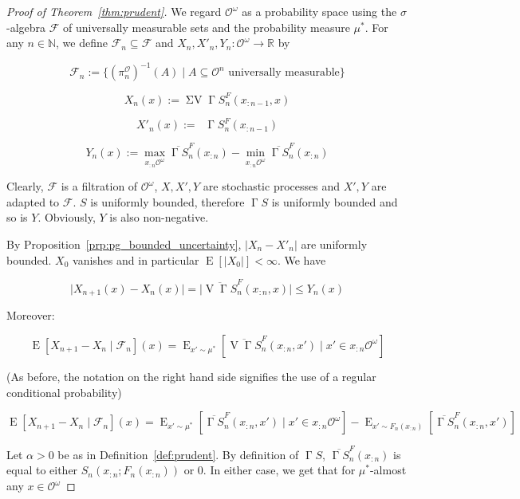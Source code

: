 \documentclass[11pt]{article}
\theoremstyle{definition}
\theoremstyle{plain}
\newcommand{\Nats}{\mathbb{N}}
\newcommand{\Reals}{\mathbb{R}}
\newcommand{\A}[1]{\lvert #1 \rvert}
\DeclareMathOperator{\E}{E}
\newcommand{\Ob}{\mathcal{O}}
\newcommand{\OO}{\Ob^\omega}
\newcommand{\PO}{\pi^\Ob}
\DeclareMathOperator{\V}{V}
\DeclareMathOperator{\SV}{\Sigma V}
\DeclareMathOperator{\SVM}{\Sigma V_{\min}}
\DeclareMathOperator{\PG}{\Gamma}
\newcommand{\F}{\mathcal{F}}
\begin{document}
\begin{proof}[Proof of Theorem~\ref{thm:prudent}]

We regard ${\OO}$ as a probability space using the ${\sigma}$-algebra $\F$ of universally measurable sets and the probability measure ${\mu^*}$. For any ${n \in \Nats}$, we define ${\F_n \subseteq \F}$ and $X_n,X'_n,Y_n: \OO \rightarrow \Reals$ by 

$$\F_n := \{\left(\PO_n\right)^{-1}\left(A\right) \mid A \subseteq \Ob^n \text{ universally measurable}\}$$

$$X_n\left(x\right):= \SV \PG{S}^F_{n}\left(x_{:n-1},x\right)$$

$$X'_n\left(x\right):= \SVM \PG{S}^F_{n}\left(x_{:n-1}\right)$$

$$Y_n\left(x\right):=\max_{x_{:n}\OO} \overline{\PG{S}}^F_{n}\left(x_{:n}\right) - \min_{x_{:n}\OO} \overline{\PG{S}}^F_{n}\left(x_{:n}\right)$$

Clearly, ${\F}$ is a filtration of ${\OO}$, ${X,X',Y}$ are stochastic processes and ${X',Y}$ are adapted to ${\F}$. ${S}$ is uniformly bounded, therefore ${\PG{S}}$  is uniformly bounded and so is ${Y}$. Obviously, ${Y}$ is also non-negative.

By Proposition~\ref{prp:pg_bounded_uncertainty}, ${\A{X_n-X'_n}}$ are uniformly bounded. ${X_0}$ vanishes and in particular ${\E\left[\A{X_0}\right] < \infty}$. We have

$$\A{X_{n+1}\left(x\right)-X_n\left(x\right)} = \A{\overline{\V{\PG{S}}}_{n}^F\left(x_{:n},x\right)} \leq Y_n\left(x\right)$$

Moreover:

$$\E\left[X_{n+1} - X_n \mid \F_n\right]\left(x\right) = \E_{x' \sim \mu^*}\left[\overline{\V{\PG{S}}}_{n}^F\left(x_{:n},x'\right) \mid x' \in x_{:n}\OO\right]$$

(As before, the notation on the right hand side signifies the use of a regular conditional probability)

$$\E\left[X_{n+1} - X_n \mid \F_n\right]\left(x\right) = \E_{x' \sim \mu^*}\left[\overline{\PG{S}}_{n}^F\left(x_{:n},x'\right) \mid x' \in x_{:n}\OO\right] - \E_{x' \sim F_n\left(x_{:n}\right)}\left[\overline{\PG{S}}_{n}^F\left(x_{:n},x'\right)\right]$$

Let $\alpha > 0$ be as in Definition~\ref{def:prudent}. By definition of $\PG{S}$, $\overline{\PG{S}}_{n}^F\left(x_{:n}\right)$ is equal to either $S_n\left(x_{:n};F_n\left(x_{:n}\right)\right)$ or 0. In either case, we get that for $\mu^*$-almost any $x \in \OO$


\end{proof}
\end{document}
